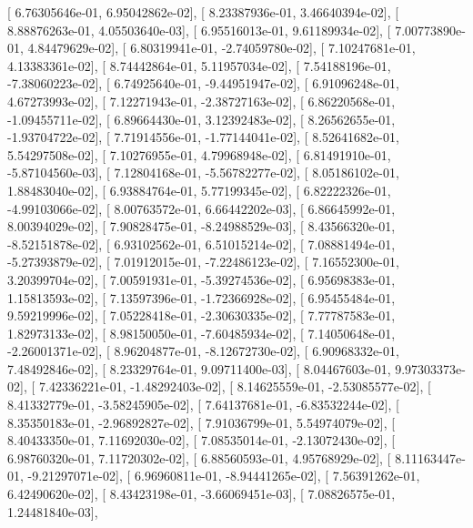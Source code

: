 \documentclass{article}
\begin{document}
       [  6.76305646e-01,   6.95042862e-02],
       [  8.23387936e-01,   3.46640394e-02],
       [  8.88876263e-01,   4.05503640e-03],
       [  6.95516013e-01,   9.61189934e-02],
       [  7.00773890e-01,   4.84479629e-02],
       [  6.80319941e-01,  -2.74059780e-02],
       [  7.10247681e-01,   4.13383361e-02],
       [  8.74442864e-01,   5.11957034e-02],
       [  7.54188196e-01,  -7.38060223e-02],
       [  6.74925640e-01,  -9.44951947e-02],
       [  6.91096248e-01,   4.67273993e-02],
       [  7.12271943e-01,  -2.38727163e-02],
       [  6.86220568e-01,  -1.09455711e-02],
       [  6.89664430e-01,   3.12392483e-02],
       [  8.26562655e-01,  -1.93704722e-02],
       [  7.71914556e-01,  -1.77144041e-02],
       [  8.52641682e-01,   5.54297508e-02],
       [  7.10276955e-01,   4.79968948e-02],
       [  6.81491910e-01,  -5.87104560e-03],
       [  7.12804168e-01,  -5.56782277e-02],
       [  8.05186102e-01,   1.88483040e-02],
       [  6.93884764e-01,   5.77199345e-02],
       [  6.82222326e-01,  -4.99103066e-02],
       [  8.00763572e-01,   6.66442202e-03],
       [  6.86645992e-01,   8.00394029e-02],
       [  7.90828475e-01,  -8.24988529e-03],
       [  8.43566320e-01,  -8.52151878e-02],
       [  6.93102562e-01,   6.51015214e-02],
       [  7.08881494e-01,  -5.27393879e-02],
       [  7.01912015e-01,  -7.22486123e-02],
       [  7.16552300e-01,   3.20399704e-02],
       [  7.00591931e-01,  -5.39274536e-02],
       [  6.95698383e-01,   1.15813593e-02],
       [  7.13597396e-01,  -1.72366928e-02],
       [  6.95455484e-01,   9.59219996e-02],
       [  7.05228418e-01,  -2.30630335e-02],
       [  7.77787583e-01,   1.82973133e-02],
       [  8.98150050e-01,  -7.60485934e-02],
       [  7.14050648e-01,  -2.26001371e-02],
       [  8.96204877e-01,  -8.12672730e-02],
       [  6.90968332e-01,   7.48492846e-02],
       [  8.23329764e-01,   9.09711400e-03],
       [  8.04467603e-01,   9.97303373e-02],
       [  7.42336221e-01,  -1.48292403e-02],
       [  8.14625559e-01,  -2.53085577e-02],
       [  8.41332779e-01,  -3.58245905e-02],
       [  7.64137681e-01,  -6.83532244e-02],
       [  8.35350183e-01,  -2.96892827e-02],
       [  7.91036799e-01,   5.54974079e-02],
       [  8.40433350e-01,   7.11692030e-02],
       [  7.08535014e-01,  -2.13072430e-02],
       [  6.98760320e-01,   7.11720302e-02],
       [  6.88560593e-01,   4.95768929e-02],
       [  8.11163447e-01,  -9.21297071e-02],
       [  6.96960811e-01,  -8.94441265e-02],
       [  7.56391262e-01,   6.42490620e-02],
       [  8.43423198e-01,  -3.66069451e-03],
       [  7.08826575e-01,   1.24481840e-03],
\end{document}
